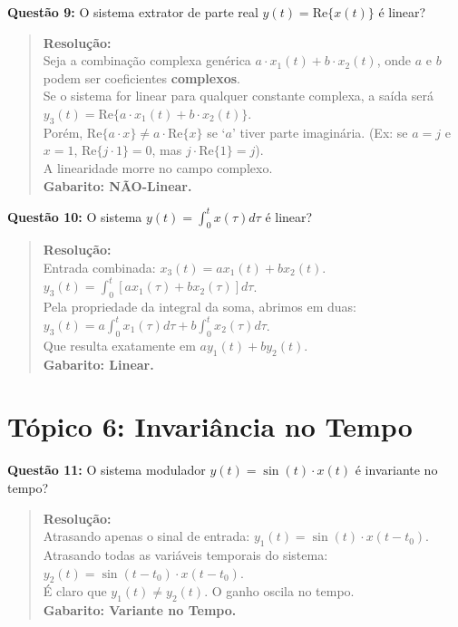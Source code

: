 \textbf{Questão 9:} O sistema extrator de parte real \(y(t) = \text{Re}\{x(t)\}\) é linear?

\begin{quote}
\textbf{Resolução:}\\
Seja a combinação complexa genérica \(a \cdot x_1(t) + b \cdot x_2(t)\), onde \(a\) e \(b\) podem ser coeficientes \textbf{complexos}.\\
Se o sistema for linear para qualquer constante complexa, a saída será \(y_3(t) = \text{Re}\{a \cdot x_1(t) + b \cdot x_2(t)\}\).\\
Porém, \(\text{Re}\{a \cdot x\} \neq a \cdot \text{Re}\{x\}\) se `\(a\)' tiver parte imaginária. (Ex: se \(a=j\) e \(x=1\), \(\text{Re}\{j \cdot 1\} = 0\), mas \(j \cdot \text{Re}\{1\} = j\)).\\
A linearidade morre no campo complexo.\\
\textbf{Gabarito: NÃO-Linear.}
\end{quote}

\textbf{Questão 10:} O sistema \(y(t) = \int_{0}^{t} x(\tau) d\tau\) é linear?

\begin{quote}
\textbf{Resolução:}\\
Entrada combinada: \(x_3(t) = ax_1(t) + bx_2(t)\).\\
\(y_3(t) = \int_{0}^{t} [ax_1(\tau) + bx_2(\tau)] d\tau\).\\
Pela propriedade da integral da soma, abrimos em duas:\\
\(y_3(t) = a\int_{0}^{t} x_1(\tau) d\tau + b\int_{0}^{t} x_2(\tau) d\tau\).\\
Que resulta exatamente em \(a y_1(t) + b y_2(t)\).\\
\textbf{Gabarito: Linear.}
\end{quote}

\section{Tópico 6: Invariância no Tempo}\label{tuxf3pico-6-invariuxe2ncia-no-tempo}

\textbf{Questão 11:} O sistema modulador \(y(t) = \sin(t) \cdot x(t)\) é invariante no tempo?

\begin{quote}
\textbf{Resolução:}\\
Atrasando apenas o sinal de entrada: \(y_1(t) = \sin(t) \cdot x(t-t_0)\).\\
Atrasando todas as variáveis temporais do sistema: \(y_2(t) = \sin(t-t_0) \cdot x(t-t_0)\).\\
É claro que \(y_1(t) \neq y_2(t)\). O ganho oscila no tempo.\\
\textbf{Gabarito: Variante no Tempo.}
\end{quote}

